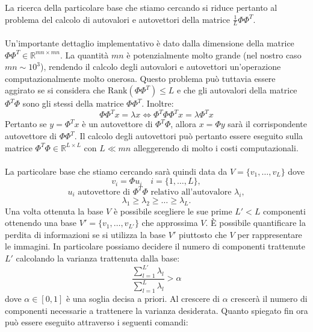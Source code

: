 La ricerca della particolare base che stiamo cercando si riduce pertanto al problema del calcolo di autovalori e autovettori della matrice  \(\frac{1}{L}\Phi \Phi^T\).
\\
\\
Un'importante dettaglio implementativo è dato dalla dimensione della matrice \(\Phi\Phi^T \in \mathbb{R}^{mn \times mn}\). La quantità \(mn\)  è potenzialmente molto grande (nel nostro caso \(mn \sim 10^3\)), rendendo il calcolo degli autovalori e autovettori un'operazione computazionalmente molto onerosa. Questo problema può tuttavia essere aggirato se si considera che \(\text{Rank}(\Phi\Phi^T) \leq L \) e che gli autovalori della matrice \(\Phi^T \Phi\) sono gli stessi della matrice \(\Phi \Phi^T\). Inoltre:
\[ \Phi\Phi^T x = \lambda x \iff \Phi^T \Phi \Phi^T x = \lambda \Phi^T x
    \]
Pertanto se \(y = \Phi^T x\) è un autovettore di \(\Phi^T \Phi\), allora \(x = \Phi y\) sarà il corrispondente autovettore di \( \Phi\Phi^T \). Il calcolo degli autovettori può pertanto essere eseguito sulla matrice \(\Phi^T \Phi \in \mathbb{R}^{L \times L}\) con \(L \ll mn \) alleggerendo di molto i costi computazionali.
\\
\\
La particolare base che stiamo cercando sarà quindi data da  \(V = \{v_1, \dots, v_L\}\) dove 
\[ v_i = \Phi u_i \quad i = \{1, \dots, L\},\]
\[u_i \text{ autovettore di } \Phi^T\Phi \text{ relativo all'autovalore } \lambda_i ,\]
\[\lambda_1 \geq \lambda_2 \geq \dots \geq \lambda_L.\]
Una volta ottenuta la base \(V\) è possibile scegliere le sue prime \(L'<L\) componenti ottenendo una base \(V' = \{v_1, \dots , v_{L'}\}\) che approssima \(V\). È possibile quantificare la perdita di informazioni se si utilizza la base \(V'\) piuttosto che \(V\) per rappresentare le immagini. In particolare possiamo decidere il numero di componenti trattenute \(L'\) calcolando la varianza trattenuta dalla base:
\[\frac{ \sum \limits_{l=1}^{L'} \lambda_l}{ \sum \limits_{l=1}^{L}\lambda_l } > \alpha\]
dove \(\alpha \in [0,1]\) è una soglia decisa a priori. Al crescere di \(\alpha\) crescerà il numero di componenti necessarie a trattenere la varianza desiderata.
Quanto spiegato fin ora può essere eseguito attraverso i seguenti comandi:

